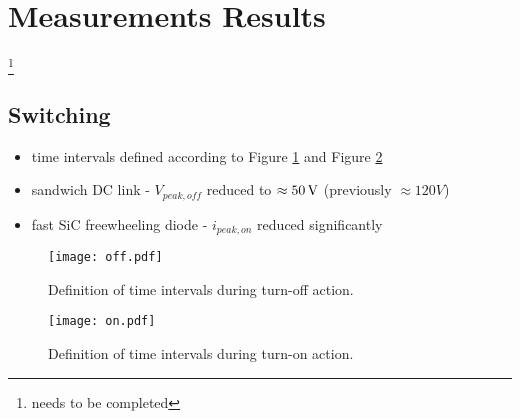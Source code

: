 \section{Measurements Results }
\footnote{needs to be completed}

\subsection{Switching}
\begin{itemize}
    \item time intervals defined according to Figure \ref{fig:def_off} and Figure \ref{fig:def_on}
    \item sandwich DC link - $V_{peak,off}$ reduced to $\approx 50\, \mathrm{V}$ (previously $\approx 120V$)
    \item fast SiC freewheeling diode - $i_{peak,on}$ reduced significantly
	
\end{itemize}

\begin{figure}[ht!]
    \centering
    \texttt{[image: off.pdf]}
    \caption{Definition of time intervals during turn-off action.}
    \label{fig:def_off}
\end{figure}
\begin{figure}[ht!]
    \centering
    \texttt{[image: on.pdf]}
    \caption{Definition of time intervals during turn-on action.}
    \label{fig:def_on}
\end{figure}

